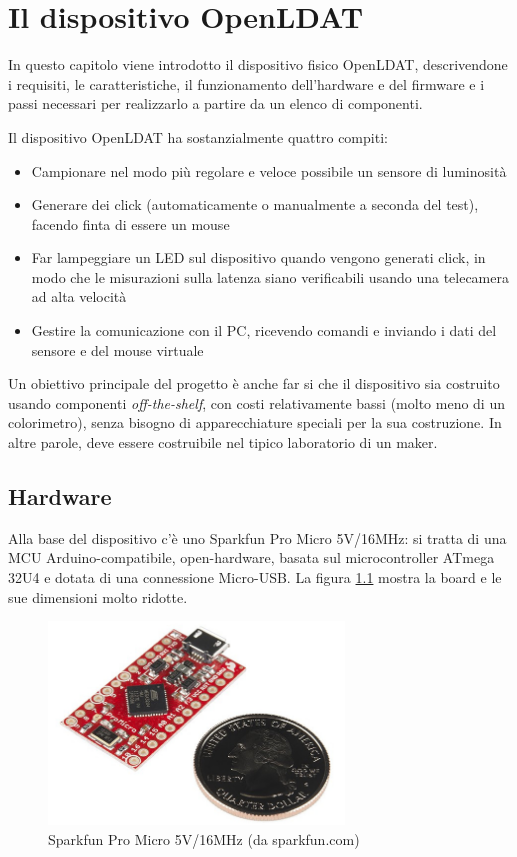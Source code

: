 \chapter{Il dispositivo OpenLDAT}
\label{chap:device}

In questo capitolo viene introdotto il dispositivo fisico OpenLDAT, descrivendone i requisiti, le caratteristiche, il funzionamento dell'hardware e del firmware e i passi necessari per realizzarlo a partire da un elenco di componenti.

Il dispositivo OpenLDAT ha sostanzialmente quattro compiti:
\begin{itemize}
	\item Campionare nel modo più regolare e veloce possibile un sensore di luminosità
	\item Generare dei click (automaticamente o manualmente a seconda del test), facendo finta di essere un mouse
	\item Far lampeggiare un LED sul dispositivo quando vengono generati click, in modo che le misurazioni sulla latenza siano verificabili usando una telecamera ad alta velocità
	\item Gestire la comunicazione con il PC, ricevendo comandi e inviando i dati del sensore e del mouse virtuale
\end{itemize}

Un obiettivo principale del progetto è anche far si che il dispositivo sia costruito usando componenti \textit{off-the-shelf}, con costi relativamente bassi (molto meno di un colorimetro), senza bisogno di apparecchiature speciali per la sua costruzione. In altre parole, deve essere costruibile nel tipico laboratorio di un maker.

\section{Hardware}
Alla base del dispositivo c'è uno Sparkfun Pro Micro 5V/16MHz: si tratta di una MCU Arduino-compatibile, open-hardware, basata sul microcontroller ATmega 32U4 e dotata di una connessione Micro-USB. La figura \ref{fig:sparkfun_promicro} mostra la board e le sue dimensioni molto ridotte.
\begin{figure}[h]
	\centering
	\includegraphics[width=0.7\textwidth]{Dispositivo_files/sparkfun_promicro.jpg}
	\caption{Sparkfun Pro Micro 5V/16MHz (da sparkfun.com)}
	\label{fig:sparkfun_promicro}
\end{figure}

